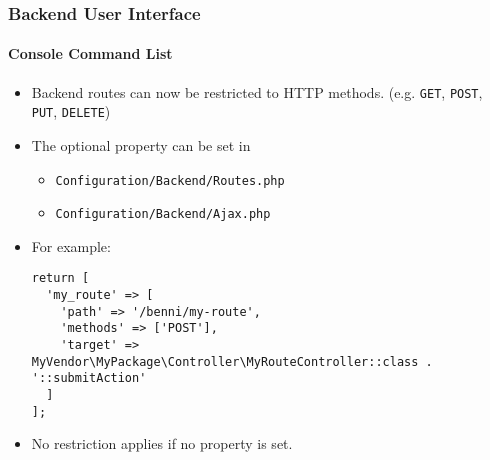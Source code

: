 %

\begin{frame}[fragile]
	\frametitle{Backend User Interface}
	\framesubtitle{Console Command List}


	\begin{itemize}
		\item Backend routes can now be restricted to HTTP methods.\newline
			\small(e.g. \texttt{GET}, \texttt{POST}, \texttt{PUT}, \texttt{DELETE})
		\item The optional property  can be set in
			\begin{itemize}\smaller
				\item \texttt{Configuration/Backend/Routes.php}
				\item \texttt{Configuration/Backend/Ajax.php}
			\end{itemize}
			\vspace{0.2cm}
		\item For example:
\begin{lstlisting}
return [
  'my_route' => [
    'path' => '/benni/my-route',
    'methods' => ['POST'],
    'target' => MyVendor\MyPackage\Controller\MyRouteController::class . '::submitAction'
  ]
];
\end{lstlisting}

		\item No restriction applies if no property is set.

	\end{itemize}

\end{frame}

